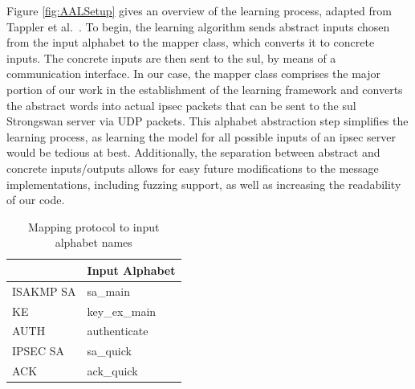 Figure \ref{fig:AALSetup} gives an overview of the learning process, adapted from Tappler et al.~\cite{tappler2017}. To begin, the learning algorithm sends abstract inputs chosen from the input alphabet to the mapper class, which converts it to concrete inputs. The concrete inputs are then sent to the \ac{sul}, by means of a communication interface. In our case, the mapper class comprises the major portion of our work in the establishment of the learning framework and converts the abstract words into actual \ac{ipsec} packets that can be sent to the \ac{sul} Strongswan server via UDP packets. This alphabet abstraction step simplifies the learning process, as learning the model for all possible inputs of an \ac{ipsec} server would be tedious at best. Additionally, the separation between abstract and concrete inputs/outputs allows for easy future modifications to the message implementations, including fuzzing support, as well as increasing the readability of our code. 

\begin{table}[h]
	\centering
	\begin{tabular}{|l|l|}
		\hline
		\rowcolor[HTML]{DAE8FC} 
		\hline
		\multicolumn{1}{|l|}{\cellcolor[HTML]{DAE8FC}\textbf{Protocol}} & \multicolumn{1}{l|}{\cellcolor[HTML]{DAE8FC}\textbf{Input Alphabet}} \\ \hline
		ISAKMP SA                                                       & sa\_main                                                             \\
		KE                                                              & key\_ex\_main                                                        \\
		AUTH                                                            & authenticate                                                         \\
		IPSEC SA                                                        & sa\_quick                                                            \\
		ACK                                                             & ack\_quick                                                           \\ \hline
	\end{tabular}
	\caption{Mapping protocol to input alphabet names}
	\label{tab:map_prot_ia}
\end{table}

